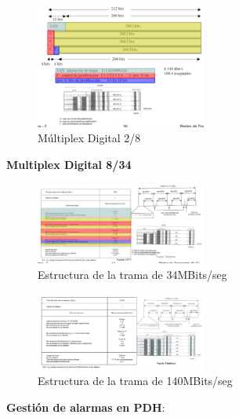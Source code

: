 \documentclass[10pt,portrait, twocolumn]{article}
\begin{document}
\begin{figure}[!ht]
	\centering
     \includegraphics[width=0.5\textwidth]{otromux}
      \caption{Múltiplex Digital 2/8}
      \label{fig:Regiones de frecuencias}
\end{figure}

\textbf{Multiplex Digital 8/34}

\begin{figure}[!ht]
	\centering
     \includegraphics[width=0.5\textwidth]{mux834}
      \caption{Estructura de la trama de 34MBits/seg}
      \label{fig:Regiones de frecuencias}
\end{figure}


\begin{figure}[!ht]
	\centering
     \includegraphics[width=0.5\textwidth]{trama140}
      \caption{Estructura de la trama de 140MBits/seg}
      \label{fig:Regiones de frecuencias}
\end{figure}

\textbf{Gestión de alarmas en PDH}:
\end{document}
